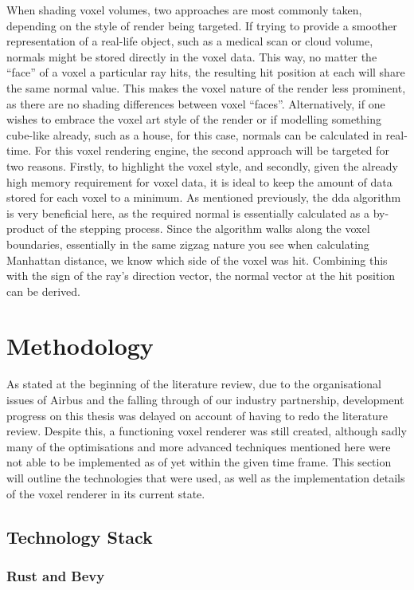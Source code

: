 \documentclass[titlepage]{article}
\begin{document}
When shading voxel volumes, two approaches are most commonly taken, depending on the style of render being targeted. If trying to provide a smoother representation of a real-life object, such as a medical scan or cloud volume, normals might be stored directly in the voxel data. This way, no matter the ``face'' of a voxel a particular ray hits, the resulting hit position at each will share the same normal value. This makes the voxel nature of the render less prominent, as there are no shading differences between voxel ``faces''. Alternatively, if one wishes to embrace the voxel art style of the render or if modelling something cube-like already, such as a house, for this case, normals can be calculated in real-time. For this voxel rendering engine, the second approach will be targeted for two reasons. Firstly, to highlight the voxel style, and secondly, given the already high memory requirement for voxel data, it is ideal to keep the amount of data stored for each voxel to a minimum. As mentioned previously, the \gls{dda} algorithm is very beneficial here, as the required normal is essentially calculated as a by-product of the stepping process. Since the algorithm walks along the voxel boundaries, essentially in the same zigzag nature you see when calculating Manhattan distance, we know which side of the voxel was hit. Combining this with the sign of the ray's direction vector, the normal vector at the hit position can be derived.

\section{Methodology}

As stated at the beginning of the literature review, due to the organisational issues of Airbus and the falling through of our industry partnership, development progress on this thesis was delayed on account of having to redo the literature review. Despite this, a functioning voxel renderer was still created, although sadly many of the optimisations and more advanced techniques mentioned here were not able to be implemented as of yet within the given time frame. This section will outline the technologies that were used, as well as the implementation details of the voxel renderer in its current state.

\subsection{Technology Stack}

\subsubsection{Rust and Bevy}
\end{document}
